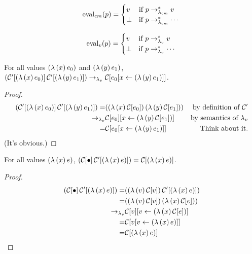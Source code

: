 \begin{defn}
\[
\mathrm{eval}_{cm}(p)=\begin{cases}
v     &\text{if $p\rightarrow_{\lambda_{cm}}^{*} v$}\\
\perp &\text{if $p\rightarrow_{\lambda_{cm}}^{*}\cdots$}
\end{cases}
\]
\end{defn}

\begin{defn}
\[
\mathrm{eval}_{v}(p)=\begin{cases}
v     &\text{if $p\rightarrow_{\lambda_v}^{*} v$}\\
\perp &\text{if $p\rightarrow_{\lambda_v}^{*}\cdots$}
\end{cases}
\]
\end{defn}

\begin{lemma}
\label{cm-app}
For all values $(\lambda\,(x)\,e_0)$ and $(\lambda\,(y)\,e_1)$, $(\mathcal{C}'[(\lambda\,(x)\,e_0)]\,\mathcal{C}'[(\lambda\,(y)\,e_1)])\rightarrow_{\lambda_v}\mathcal{C}[e_0[x\leftarrow (\lambda\,(y)\,e_1)]]$.
\end{lemma}

\begin{proof}
\begin{align*}
(\mathcal{C}'[(\lambda\,(x)\,e_0)]\,\mathcal{C}'[(\lambda\,(y)\,e_1)]) = &((\lambda\,(x)\,\mathcal{C}[e_0])\,(\lambda\,(y)\,\mathcal{C}[e_1]))&\text{by definition of $\mathcal{C}'$}\\
                                       \rightarrow_{\lambda_v} &\mathcal{C}[e_0][x\leftarrow (\lambda\,(y)\,\mathcal{C}[e_1])]&\text{by semantics of $\lambda_v$}\\
                                           = &\mathcal{C}[e_0[x\leftarrow (\lambda\,(y)\,e_1)]]&\text{Think about it.}
\end{align*}
(It's obvious.)
\end{proof}

\begin{lemma}
\label{hole-context-to-value}
For all values $(\lambda\,(x)\,e)$, $(\mathcal{C}[\bullet]\,\mathcal{C}'[(\lambda\,(x)\,e)])=\mathcal{C}[(\lambda\,(x)\,e)]$.
\end{lemma}

\begin{proof}
\begin{align*}
(\mathcal{C}[\bullet]\,\mathcal{C}'[(\lambda\,(x)\,e)]) = &((\lambda\,(v)\,\mathcal{C}[v])\,\mathcal{C}'[(\lambda\,(x)\,e)])\\
                                 = &((\lambda\,(v)\,\mathcal{C}[v])\,(\lambda\,(x)\,\mathcal{C}[e]))\\
                             \rightarrow_{\lambda_v} &\mathcal{C}[v][v\leftarrow (\lambda\,(x)\,\mathcal{C}[e])]\\
                                 = &\mathcal{C}[v[v\leftarrow (\lambda\,(x)\,e)]]\\
                                 = &\mathcal{C}[(\lambda\,(x)\,e)]
\end{align*}
\end{proof}

